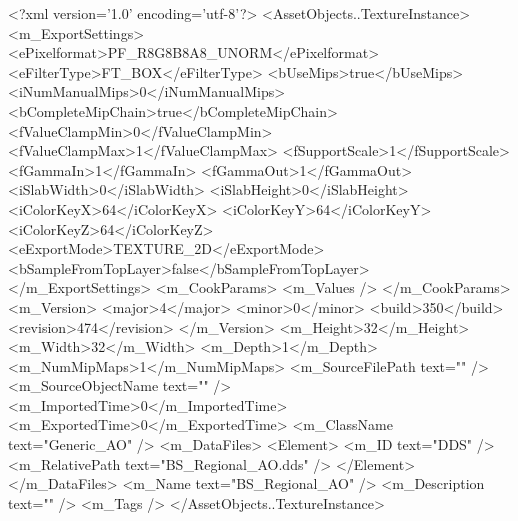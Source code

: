 <?xml version='1.0' encoding='utf-8'?>
<AssetObjects..TextureInstance>
  <m_ExportSettings>
    <ePixelformat>PF_R8G8B8A8_UNORM</ePixelformat>
    <eFilterType>FT_BOX</eFilterType>
    <bUseMips>true</bUseMips>
    <iNumManualMips>0</iNumManualMips>
    <bCompleteMipChain>true</bCompleteMipChain>
    <fValueClampMin>0</fValueClampMin>
    <fValueClampMax>1</fValueClampMax>
    <fSupportScale>1</fSupportScale>
    <fGammaIn>1</fGammaIn>
    <fGammaOut>1</fGammaOut>
    <iSlabWidth>0</iSlabWidth>
    <iSlabHeight>0</iSlabHeight>
    <iColorKeyX>64</iColorKeyX>
    <iColorKeyY>64</iColorKeyY>
    <iColorKeyZ>64</iColorKeyZ>
    <eExportMode>TEXTURE_2D</eExportMode>
    <bSampleFromTopLayer>false</bSampleFromTopLayer>
  </m_ExportSettings>
  <m_CookParams>
    <m_Values />
  </m_CookParams>
  <m_Version>
    <major>4</major>
    <minor>0</minor>
    <build>350</build>
    <revision>474</revision>
  </m_Version>
  <m_Height>32</m_Height>
  <m_Width>32</m_Width>
  <m_Depth>1</m_Depth>
  <m_NumMipMaps>1</m_NumMipMaps>
  <m_SourceFilePath text="" />
  <m_SourceObjectName text="" />
  <m_ImportedTime>0</m_ImportedTime>
  <m_ExportedTime>0</m_ExportedTime>
  <m_ClassName text="Generic_AO" />
  <m_DataFiles>
    <Element>
      <m_ID text="DDS" />
      <m_RelativePath text="BS_Regional_AO.dds" />
    </Element>
  </m_DataFiles>
  <m_Name text="BS_Regional_AO" />
  <m_Description text="" />
  <m_Tags />
</AssetObjects..TextureInstance>